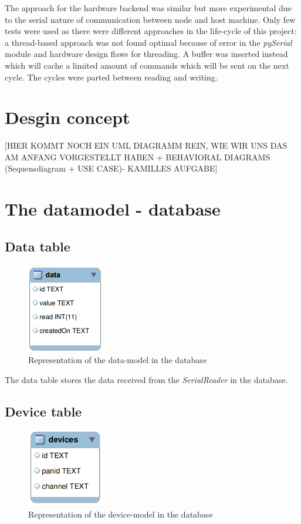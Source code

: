 The approach for the hardware backend was similar but more experimental due to the serial nature of communication between node and host machine. Only
few tests were used as there were different approaches in the life-cycle of this project: a thread-based approach was not found optimal because 
of error in the \textit{pySerial} module and hardware design flaws for threading. A buffer was inserted instead which will cache a limited amount of commands which
will be sent on the next cycle. The cycles were parted between reading and writing.

\section{Desgin concept}
[HIER KOMMT NOCH EIN UML DIAGRAMM REIN, WIE WIR UNS DAS AM ANFANG VORGESTELLT HABEN  + BEHAVIORAL DIAGRAMS (Sequensdiagram + USE CASE)- KAMILLES AUFGABE]

\newpage
\section{The datamodel - database}
\subsection{Data table}
\begin{figure}[H]
	\centering
	\includegraphics[width=0.3\textwidth]{pic/DatamodelData.png}%
    \caption{Representation of the data-model in the database}
    \label{DatamodelDatapic}%
\end{figure}

The data table stores the data received from the \textit{SerialReader} in the database.

\newpage
\subsection{Device table}
\begin{figure}[H]
	\centering
	\includegraphics[width=0.3\textwidth]{pic/DatamodelDevices.png}%
    \caption{Representation of the device-model in the database}
    \label{DatamodelDevicespic}%
\end{figure}


